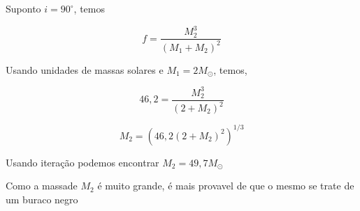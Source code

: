 \documentclass[11pt]{article}
\begin{document}
\begin{pproblem}
\begin{pssolution*}{}{}
\begin{alternativas}
            \item Suponto $i = 90^\circ$, temos 
            
            $$f = \frac{M_2^3}{(M_1+M_2)^2}$$

            Usando unidades de massas solares e $M_1 = 2M_\odot$, temos, 

            $$46,2 = \frac{M_2^3}{(2+M_2)^2}$$

            $$M_2 = \left(46,2 (2+M_2)^2\right)^{1/3}$$

            Usando iteração podemos encontrar $\boxed{M_2 = 49,7 M_\odot }$

            \item Como a massade \(M_2\) é muito grande, é mais provavel de que o mesmo se trate de um buraco negro
        \end{alternativas}
    \end{pssolution*}
\end{pproblem}
\end{document}
